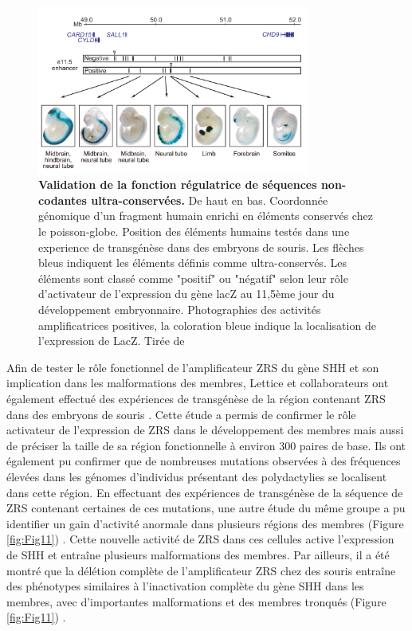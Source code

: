 \begin{figure}[h]
    \centering
    \includegraphics[width=0.8\textwidth, page=1] {figures/introduction/fig10.png}
    \caption[Validation de la fonction régulatrice de séquences non-codantes ultra-conservées.]{
    \textbf{Validation de la fonction régulatrice de séquences non-codantes ultra-conservées.} De haut en bas. Coordonnée génomique d'un fragment humain enrichi en éléments conservés chez le poisson-globe. Position des éléments humains testés dans une experience de transgénèse dans des embryons de souris. Les flèches bleus indiquent les éléments définis comme ultra-conservés. Les éléments sont classé comme "positif" ou "négatif" selon leur rôle d'activateur de l'expression du gène lacZ au 11,5ème jour du développement embryonnaire. Photographies des activités amplificatrices positives, la coloration bleue indique la localisation de l'expression de LacZ. Tirée de \citep{pennacchio_vivo_2006}\\
    }
    \label{fig:Fig10}
\end{figure}

Afin de tester le rôle fonctionnel de l’\gls{amplificateur} \acrshort{ZRS} du gène \acrshort{SHH} et son implication dans les malformations des membres, Lettice et collaborateurs ont également effectué des expériences de transgénèse de la région contenant \acrshort{ZRS} dans des embryons de souris \citep{lettice_long-range_2003}. Cette étude a permis de confirmer le rôle activateur de l’expression de \acrshort{ZRS} dans le développement des membres mais aussi de préciser la taille de sa région fonctionnelle à environ 300 paires de base. Ils ont également pu confirmer que de nombreuses mutations observées à des fréquences élevées dans les génomes d’individus présentant des polydactylies se localisent dans cette région. En effectuant des expériences de transgénèse de la séquence de \acrshort{ZRS} contenant certaines de ces mutations, une autre étude du même groupe a pu identifier un gain d’activité anormale dans plusieurs régions des membres (Figure \ref{fig:Fig11}) \citep{lettice_point_2008}. Cette nouvelle activité de \acrshort{ZRS} dans ces cellules active l’expression de \acrshort{SHH} et entraîne plusieurs malformations des membres. Par ailleurs, il a été montré que la délétion complète de l’\gls{amplificateur} \acrshort{ZRS} chez des souris entraîne des phénotypes similaires à l’inactivation complète du gène \acrshort{SHH} dans les membres, avec d’importantes malformations et des membres tronqués (Figure \ref{fig:Fig11}) \citep{sagai_elimination_2005}. 

